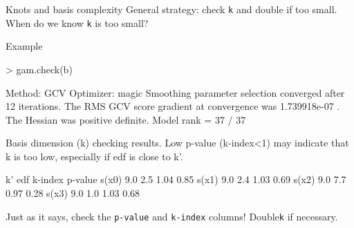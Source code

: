

\begin{block}{Knots and basis complexity}
  General strategy: check \texttt{k} and double if too small.\\
  When do we know \texttt{k} is too small?

        \begin{exampleblock}{Example}
          \begin{Rbg}
> gam.check(b)

Method: GCV   Optimizer: magic
Smoothing parameter selection converged
after 12 iterations.
The RMS GCV score gradient at convergence
was 1.739918e-07 .
The Hessian was positive definite.
Model rank =  37 / 37 

Basis dimension (k) checking results. 
Low p-value (k-index<1) may
indicate that k is too low, especially if
edf is close to k'.

       k' edf k-index p-value
s(x0) 9.0 2.5    1.04    0.85
s(x1) 9.0 2.4    1.03    0.69
s(x2) 9.0 7.7    0.97    0.28
s(x3) 9.0 1.0    1.03    0.68

          \end{Rbg}
        \end{exampleblock}
Just as it says, check the \texttt{p-value} and \texttt{k-index} columns! Double\texttt{k} if necessary.

\end{block}

